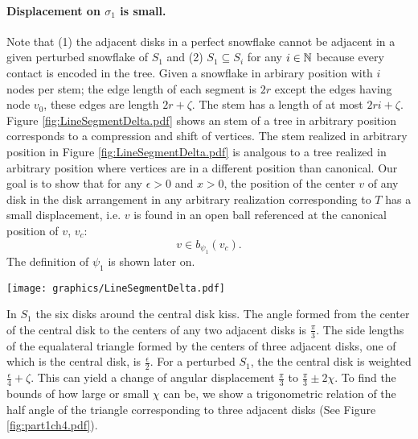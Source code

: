 
\paragraph{Displacement on $\sigma_1$ is small.}
Note that (1) the adjacent disks in a perfect snowflake cannot be adjacent in a given perturbed snowflake of $S_1$ and (2) $S_1 \subseteq S_i$ for any $i \in {\mathbb{N}}$ because every contact is encoded in the tree.  
Given a snowflake in arbirary position with $i$ nodes per stem; the edge length of each segment is $2r$ except the edges having node $v_0$, these edges are length $2r+ \zeta$.  
The stem has a length of at most $2ri+\zeta$.
Figure \ref{fig:LineSegmentDelta.pdf} shows an stem of a tree in arbitrary position corresponds to a compression and shift of vertices.  
The stem realized in arbitrary position in Figure \ref{fig:LineSegmentDelta.pdf} is analgous to a tree realized in arbitrary position where vertices are in a different position than canonical.  
Our goal is to show that for any $\epsilon >0$ and $x >0$, the position of the center $v$ of any disk in the disk arrangement in any arbitrary realization corresponding to $T$ has a small displacement, i.e. $v$ is found in an open ball referenced at the canonical position of $v$, $v_c$: $$v \in b_{\psi_1}(v_c).$$ 
The definition of $\psi_1$ is shown later on.

\begin{minipage}{\linewidth}
\begin{center}
\texttt{[image: graphics/LineSegmentDelta.pdf]}
\label{fig:LineSegmentDelta.pdf}
\end{center}
\end{minipage}
 
In $S_1$ the six disks around the central disk kiss.  
The angle formed from the center of the central disk to the centers of any two adjacent disks is $\frac{\pi}{3}$.  
The side lengths of the equalateral triangle formed by the centers of three adjacent disks, one of which is the central disk, is $\frac{\epsilon}{2}$.  
For a perturbed $S_1$, the the central disk is weighted $\frac{\epsilon}{4} + \zeta$.  
This can yield a change of angular displacement $\frac{\pi}{3}$ to $\frac{\pi}{3} \pm 2\chi$.  
To find the bounds of how large or small $\chi$ can be, we show a trigonometric relation of the half angle of the triangle corresponding to three adjacent disks (See Figure \ref{fig:part1ch4.pdf}).

